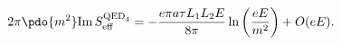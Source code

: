 \begin{equation}
\label{Eq_0612}
2\pi \pdo{m^2} \text{Im} \, S^{\text{QED}_4}_{\text{eff}}
  = -\frac{e\pi a \tau L_1 L_2 E}{8\pi} \ln\left(\frac{eE}{m^2}\right)
    + O(eE).
\end{equation}

